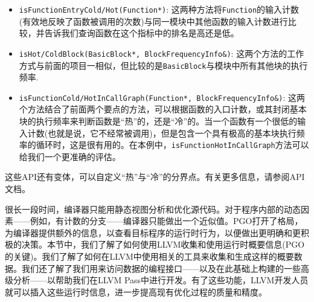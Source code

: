 \begin{itemize}
\item \texttt{isFunctionEntryCold/Hot(Function*)}: 这两种方法将\texttt{Function}的输入计数(有效地反映了函数被调用的次数)与同一模块中其他函数的输入计数进行比较，并告诉我们查询函数在这个指标中的排名是高还是低。

\item \texttt{isHot/ColdBlock(BasicBlock*, BlockFrequencyInfo\&)}: 这两个方法的工作方式与前面的项目一相似，但比较的是\texttt{BasicBlock}与模块中所有其他块的执行频率.

\item \texttt{isFunctionCold/HotInCallGraph(Function*,
BlockFrequencyInfo\&)}: 这两个方法结合了前面两个要点的方法，可以根据函数的入口计数，或其封闭基本块的执行频率来判断函数是“热”的，还是“冷”的。当一个函数有一个很低的输入计数(也就是说，它不经常被调用)，但是包含一个具有极高的基本块执行频率的循环时，这是很有用的。在本例中，\texttt{isFunctionHotInCallGraph}方法可以给我们一个更准确的评估。

\end{itemize}

这些API还有变体，可以自定义“热”与“冷”的分界点。有关更多信息，请参阅API文档。

很长一段时间，编译器只能用静态视图分析和优化源代码。对于程序内部的动态因素——例如，有计数的分支——编译器只能做出一个近似值。PGO打开了格局，为编译器提供额外的信息，以查看目标程序的运行时行为，以便做出更明确和更积极的决策。本节中，我们了解了如何使用LLVM收集和使用运行时概要信息(PGO的关键)。我们了解了如何在LLVM中使用相关的工具来收集和生成这样的概要数据。我们还了解了我们用来访问数据的编程接口——以及在此基础上构建的一些高级分析——以帮助我们在LLVM Pass中进行开发。有了这些功能，LLVM开发人员就可以插入这些运行时信息，进一步提高现有优化过程的质量和精度。














